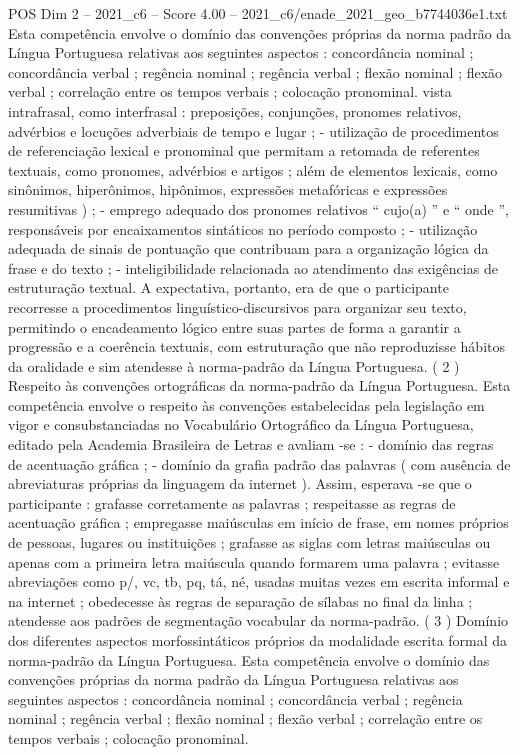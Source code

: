 \begin{textsample}{POS Dim 2 – 2021\_c6 – Score 4.00 – 2021\_c6/enade\_2021\_geo\_b7744036e1.txt}
Esta competência envolve o domínio das convenções próprias da norma padrão da Língua Portuguesa relativas aos seguintes aspectos : concordância nominal ; concordância verbal ; regência nominal ; regência verbal ; flexão nominal ; flexão verbal ; correlação entre os tempos verbais ; colocação pronominal. vista intrafrasal, como interfrasal : preposições, conjunções, pronomes relativos, advérbios e locuções adverbiais de tempo e lugar ; - utilização de procedimentos de referenciação lexical e pronominal que permitam a retomada de referentes textuais, como pronomes, advérbios e artigos ; além de elementos lexicais, como sinônimos, hiperônimos, hipônimos, expressões metafóricas e expressões resumitivas ) ; - emprego adequado dos pronomes relativos “ cujo(a) ” e “ onde ”, responsáveis por encaixamentos sintáticos no período composto ; - utilização adequada de sinais de pontuação que contribuam para a organização lógica da frase e do texto ; - inteligibilidade relacionada ao atendimento das exigências de estruturação textual.
A expectativa, portanto, era de que o participante recorresse a procedimentos linguístico-discursivos para organizar seu texto, permitindo o encadeamento lógico entre suas partes de forma a garantir a progressão e a coerência textuais, com estruturação que não reproduzisse hábitos da oralidade e sim atendesse à norma-padrão da Língua Portuguesa. ( 2 ) Respeito às convenções ortográficas da norma-padrão da Língua Portuguesa.
Esta competência envolve o respeito às convenções estabelecidas pela legislação em vigor e consubstanciadas no Vocabulário Ortográfico da Língua Portuguesa, editado pela Academia Brasileira de Letras e avaliam -se : - domínio das regras de acentuação gráfica ; - domínio da grafia padrão das palavras ( com ausência de abreviaturas próprias da linguagem da internet ).
Assim, esperava -se que o participante : grafasse corretamente as palavras ; respeitasse as regras de acentuação gráfica ; empregasse maiúsculas em início de frase, em nomes próprios de pessoas, lugares ou instituições ; grafasse as siglas com letras maiúsculas ou apenas com a primeira letra maiúscula quando formarem uma palavra ; evitasse abreviações como p/, vc, tb, pq, tá, né, usadas muitas vezes em escrita informal e na internet ; obedecesse às regras de separação de sílabas no final da linha ; atendesse aos padrões de segmentação vocabular da norma-padrão. ( 3 ) Domínio dos diferentes aspectos morfossintáticos próprios da modalidade escrita formal da norma-padrão da Língua Portuguesa.
Esta competência envolve o domínio das convenções próprias da norma padrão da Língua Portuguesa relativas aos seguintes aspectos : concordância nominal ; concordância verbal ; regência nominal ; regência verbal ; flexão nominal ; flexão verbal ; correlação entre os tempos verbais ; colocação pronominal.

\end{textsample}
